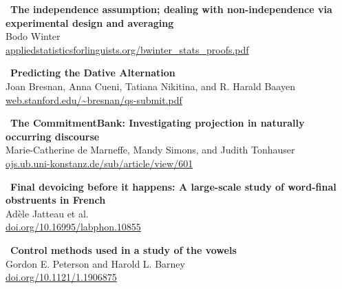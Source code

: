 \documentclass[11pt,letterpaper]{article}
\begin{document}
\begin{tcolorbox}[colback=white,colframe=accentblue,boxrule=0.5pt,arc=2mm]
\faBook\ \textbf{The independence assumption; dealing with non-independence via experimental design and averaging}\\
\phantom{\faBook\ }Bodo Winter\\
\phantom{\faBook\ }\href{https://appliedstatisticsforlinguists.org/bwinter_stats_proofs.pdf}{appliedstatisticsforlinguists.org/bwinter\_stats\_proofs.pdf}
\end{tcolorbox}

\begin{tcolorbox}[colback=white,colframe=accentblue,boxrule=0.5pt,arc=2mm]
\faBook\ \textbf{Predicting the Dative Alternation}\\
\phantom{\faBook\ }Joan Bresnan, Anna Cueni, Tatiana Nikitina, and R. Harald Baayen\\
\phantom{\faBook\ }\href{https://web.stanford.edu/~bresnan/qs-submit.pdf}{web.stanford.edu/{\textasciitilde}bresnan/qs-submit.pdf}
\end{tcolorbox}

\begin{tcolorbox}[colback=white,colframe=accentblue,boxrule=0.5pt,arc=2mm]
\faBook\ \textbf{The CommitmentBank: Investigating projection in naturally occurring discourse}\\
\phantom{\faBook\ }Marie-Catherine de Marneffe, Mandy Simons, and Judith Tonhauser\\
\phantom{\faBook\ }\href{https://ojs.ub.uni-konstanz.de/sub/index.php/sub/article/view/601}{ojs.ub.uni-konstanz.de/sub/article/view/601}
\end{tcolorbox}

\begin{tcolorbox}[colback=white,colframe=accentblue,boxrule=0.5pt,arc=2mm]
\faBook\ \textbf{Final devoicing before it happens: A large-scale study of word-final obstruents in French}\\
\phantom{\faBook\ }Adèle Jatteau et al.\\
\phantom{\faBook\ }\href{https://doi.org/10.16995/labphon.10855}{doi.org/10.16995/labphon.10855}
\end{tcolorbox}

\begin{tcolorbox}[colback=white,colframe=accentblue,boxrule=0.5pt,arc=2mm]
\faBook\ \textbf{Control methods used in a study of the vowels}\\
\phantom{\faBook\ }Gordon E. Peterson and Harold L. Barney\\
\phantom{\faBook\ }\href{https://doi.org/10.1121/1.1906875}{doi.org/10.1121/1.1906875}
\end{tcolorbox}
\end{document}

